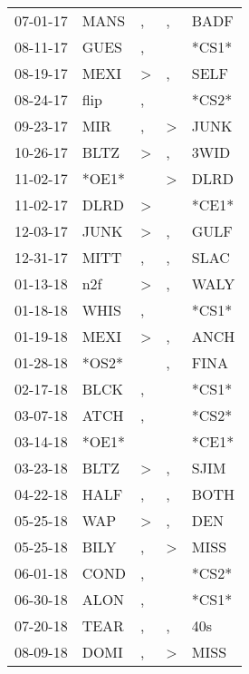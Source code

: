 \begin{supertabular}{lllll}
 07-01-17 &   MANS &                , &             , &   BADF \\
 08-11-17 &   GUES &                , &               &  *CS1* \\
 08-19-17 &   MEXI &     \textgreater &             , &   SELF \\
 08-24-17 &   flip &                , &               &  *CS2* \\
 09-23-17 &    MIR &                , &  \textgreater &   JUNK \\
 10-26-17 &   BLTZ &     \textgreater &             , &   3WID \\
 11-02-17 &  *OE1* &                  &  \textgreater &   DLRD \\
 11-02-17 &   DLRD &     \textgreater &               &  *CE1* \\
 12-03-17 &   JUNK &     \textgreater &             , &   GULF \\
 12-31-17 &   MITT &                , &             , &   SLAC \\
 01-13-18 &    n2f &     \textgreater &             , &   WALY \\
 01-18-18 &   WHIS &                , &               &  *CS1* \\
 01-19-18 &   MEXI &     \textgreater &             , &   ANCH \\
 01-28-18 &  *OS2* &                  &             , &   FINA \\
 02-17-18 &   BLCK &                , &               &  *CS1* \\
 03-07-18 &   ATCH &                , &               &  *CS2* \\
 03-14-18 &  *OE1* &                  &               &  *CE1* \\
 03-23-18 &   BLTZ &     \textgreater &             , &   SJIM \\
 04-22-18 &   HALF &                , &             , &   BOTH \\
 05-25-18 &    WAP &     \textgreater &             , &    DEN \\
 05-25-18 &   BILY &                , &  \textgreater &   MISS \\
 06-01-18 &   COND &                , &               &  *CS2* \\
 06-30-18 &   ALON &                , &               &  *CS1* \\
 07-20-18 &   TEAR &                , &             , &    40s \\
 08-09-18 &   DOMI &                , &  \textgreater &   MISS \\

\end{supertabular}
